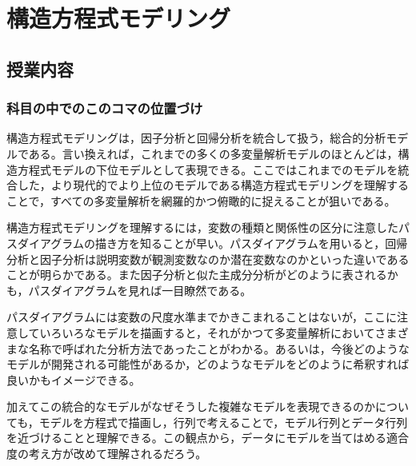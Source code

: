 \section{構造方程式モデリング}
\subsection{授業内容}
\subsubsection{科目の中でのこのコマの位置づけ}
構造方程式モデリングは，因子分析と回帰分析を統合して扱う，総合的分析モデルである。言い換えれば，これまでの多くの多変量解析モデルのほとんどは，構造方程式モデルの下位モデルとして表現できる。ここではこれまでのモデルを統合した，より現代的でより上位のモデルである構造方程式モデリングを理解することで，すべての多変量解析を網羅的かつ俯瞰的に捉えることが狙いである。

構造方程式モデリングを理解するには，変数の種類と関係性の区分に注意したパスダイアグラムの描き方を知ることが早い。パスダイアグラムを用いると，回帰分析と因子分析は説明変数が観測変数なのか潜在変数なのかといった違いであることが明らかである。また因子分析と似た主成分分析がどのように表されるかも，パスダイアグラムを見れば一目瞭然である。

パスダイアグラムには変数の尺度水準までかきこまれることはないが，ここに注意していろいろなモデルを描画すると，それがかつて多変量解析においてさまざまな名称で呼ばれた分析方法であったことがわかる。あるいは，今後どのようなモデルが開発される可能性があるか，どのようなモデルをどのように希釈すれば良いかもイメージできる。

加えてこの統合的なモデルがなぜそうした複雑なモデルを表現できるのかについても，モデルを方程式で描画し，行列で考えることで，モデル行列とデータ行列を近づけることと理解できる。この観点から，データにモデルを当てはめる適合度の考え方が改めて理解されるだろう。
